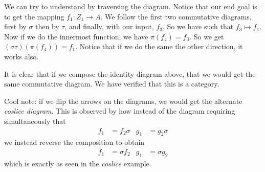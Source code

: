 \documentclass{report}
\begin{document}
\begin{examples}
\begin{example}[\label{exm:1.3.9}]
            \begin{center}
            \end{center}
            We can try to understand by traversing the diagram. Notice that our end goal is to get the mapping $f_{1} : Z_{1} \rightarrow A$. We follow the first two commutative diagrams, first by $\sigma$ then by $\tau$, and finally, with our input, $f_{3}$. So we have such that $f_{3} \mapsto f_{1}$. Now if we do the innermost function, we have $\pi(f_{4}) = f_{3}$. So we get $(\sigma\tau)(\pi(f_{4})) = f_{1}$. Notice that if we do the same the other direction, it works also.

        It is clear that if we compose the identity diagram above, that we would get the same commutative diagram. We have verified that this is a category.

        Cool note: if we flip the arrows on the diagrams, we would get the alternate \textit{coslice diagram}. This is observed by how instead of the diagram requiring simultaneously that
            \begin{align*}
                f_{1} &= f_{2}\sigma & g_{1} &= g_{2}\sigma   
            \end{align*}
            we instead reverse the composition to obtain
            \begin{align*}
                f_{1} &= \sigma f_{2} & g_{1} &= \sigma g_{2}   
            \end{align*} 
        which is exactly as seen in the \textit{coslice} example.
    \end{example}


\end{examples}
\end{document}
